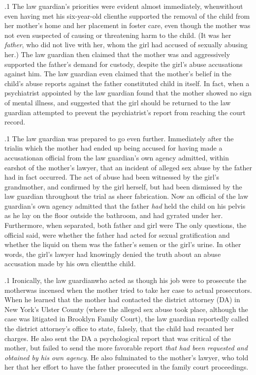 \documentclass[11pt, twoside]{article}
\begin{document}
{\p.1{%
The law guardian’s priorities were evident almost immediately,
when\mdash{}without even having met his six-year-old client\mdash{}he supported
the removal of the child from her mother’s home and her placement in
foster care, even though the mother was not even suspected of causing or threatening harm to the child. (It was her \textit{father}, who did not
live with her, whom the girl had accused of sexually abusing her.) The
law guardian then claimed that the mother was  and aggressively supported the father’s demand for custody, despite the girl’s
abuse accusations against him. The law guardian even claimed that the
mother’s belief in the child’s abuse reports against the father constituted
child  in itself. In fact, when a psychiatrist appointed by the law
guardian found that the mother showed no sign of mental illness, and
suggested that the girl should be returned to  the law guardian attempted to prevent the psychiatrist’s
report from reaching the court record.
}%

\p.1{%
The law guardian was prepared to go even further. Immediately after
the trial\mdash{}in which the mother had ended up being accused for having made a  accusation\mdash{}an official from the law guardian’s own
agency admitted, within earshot of the mother’s lawyer, that an incident
of alleged sex abuse by the father had in fact occurred. The act of abuse
had been witnessed by the girl’s grandmother, and confirmed by the girl
herself, but had been dismissed by the law guardian throughout the trial
as sheer fabrication. Now an official of the law guardian’s own agency admitted that the father \textit{had} held the child on his pelvis as he lay on the
floor outside the bathroom, and had gyrated under her. Furthermore,
when separated, both father and girl were  The only questions, the
official said, were whether the father had acted for sexual gratification
and whether the liquid on them was the father’s semen or the girl’s urine.
In other words, the girl’s lawyer had knowingly denied the truth about
an abuse accusation made by his own client\mdash{}the child.
}%

\p.1{%
Ironically, the law guardian\mdash{}who acted as though his job were to
prosecute the mother\mdash{}was incensed when the mother tried to take her
case to actual prosecutors. When he learned that the mother had contacted the district attorney (DA) in New York’s Ulster County (where
the alleged sex abuse took place, although the case was litigated in
Brooklyn Family Court), the law guardian reportedly called the district attorney’s office to state, falsely, that the child had recanted her
charges. He also sent the DA a psychological report that was critical of the mother, but failed to send the more favorable report \textit{that had
been requested and obtained by his own agency}. He also fulminated to
the mother’s lawyer, who told her that her effort to have the father prosecuted  in the family court
proceedings.
}%

}
\end{document}
